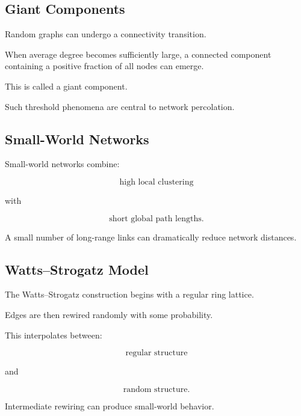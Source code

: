 \subsection{Giant Components}
\label{subsec:giant-components}

Random graphs can undergo a connectivity transition.

When average degree becomes sufficiently large, a connected component
containing a positive fraction of all nodes can emerge.

This is called a giant component.

Such threshold phenomena are central to network percolation.

\subsection{Small-World Networks}
\label{subsec:small-world-networks}

Small-world networks combine:

\[
\boxed{
\text{high local clustering}
}
\]

with

\[
\boxed{
\text{short global path lengths}.
}
\]

A small number of long-range links can dramatically reduce network
distances.

\subsection{Watts--Strogatz Model}
\label{subsec:watts-strogatz-model}

The Watts--Strogatz construction begins with a regular ring lattice.

Edges are then rewired randomly with some probability.

This interpolates between:

\[
\boxed{
\text{regular structure}
}
\]

and

\[
\boxed{
\text{random structure}.
}
\]

Intermediate rewiring can produce small-world behavior.


